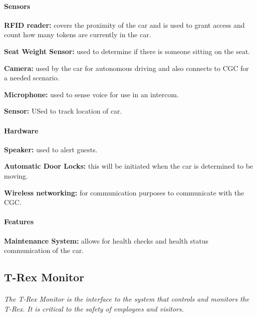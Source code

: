 \documentclass[12pt]{article}
\begin{document}
	\paragraph{Sensors}
	\begin{list}{}{}
		\item \textbf{RFID reader: }covers the proximity of the car and is used 
		to grant access and count how many tokens are currently in the car. 
		\item \textbf{Seat Weight Sensor: }used to determine if there is someone 
		sitting on the seat. 
		\item \textbf{Camera: }used by the car for autonomous driving and also 
		connects to CGC for a needed scenario. 
		\item \textbf{Microphone: }used to sense voice for use in an intercom.
		\item \textbf{Sensor: }USed to track location of car.
	\end{list}
		
	\paragraph{Hardware}
	\begin{list}{}{}
		\item \textbf{Speaker: }used to alert guests.
		\item \textbf{Automatic Door Locks: }this will be initiated when the car 
		is determined to be moving.
		\item \textbf{Wireless networking: }for communication purposes to communicate 
		with the CGC.
	\end{list}
	
	\paragraph{Features}
	\begin{list}{}{}
		\item \textbf{Maintenance System: }allows for health checks and health status 
		communication of the car.  
	\end{list}

	\subsection{T-Rex Monitor}
	\paragraph{} \textit{ The T-Rex Monitor is the interface to the system that controls 
	and monitors the T-Rex. It is critical to the safety of employees and visitors. }
		
\end{document}
